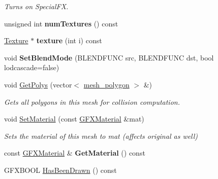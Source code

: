 \begin{DoxyCompactItemize}
\begin{DoxyCompactList}\small\item\em Turns on Special\+FX. \end{DoxyCompactList}\item 
unsigned int {\bfseries num\+Textures} () const \hypertarget{classMesh_a824d591c1cf5832f2dfadd765eb64cd2}{}\label{classMesh_a824d591c1cf5832f2dfadd765eb64cd2}

\item 
\hyperlink{classTexture}{Texture} $\ast$ {\bfseries texture} (int i) const \hypertarget{classMesh_ad19ac95e4498e54ecde68b92ed2b9863}{}\label{classMesh_ad19ac95e4498e54ecde68b92ed2b9863}

\item 
void {\bfseries Set\+Blend\+Mode} (B\+L\+E\+N\+D\+F\+U\+NC src, B\+L\+E\+N\+D\+F\+U\+NC dst, bool lodcascade=false)\hypertarget{classMesh_ad809849a87287d0b89f94a43120718ce}{}\label{classMesh_ad809849a87287d0b89f94a43120718ce}

\item 
void \hyperlink{classMesh_a84d2ab29e6396ba87c49813145ab2bc2}{Get\+Polys} (vector$<$ \hyperlink{structmesh__polygon}{mesh\+\_\+polygon} $>$ \&)\hypertarget{classMesh_a84d2ab29e6396ba87c49813145ab2bc2}{}\label{classMesh_a84d2ab29e6396ba87c49813145ab2bc2}

\begin{DoxyCompactList}\small\item\em Gets all polygons in this mesh for collision computation. \end{DoxyCompactList}\item 
void \hyperlink{classMesh_ad6f7f5a5972fbb324a304c4f6f8d7d56}{Set\+Material} (const \hyperlink{structGFXMaterial}{G\+F\+X\+Material} \&mat)\hypertarget{classMesh_ad6f7f5a5972fbb324a304c4f6f8d7d56}{}\label{classMesh_ad6f7f5a5972fbb324a304c4f6f8d7d56}

\begin{DoxyCompactList}\small\item\em Sets the material of this mesh to mat (affects original as well) \end{DoxyCompactList}\item 
const \hyperlink{structGFXMaterial}{G\+F\+X\+Material} \& {\bfseries Get\+Material} () const \hypertarget{classMesh_a683abc592f5e406a45d44704aadb9956}{}\label{classMesh_a683abc592f5e406a45d44704aadb9956}

\item 
G\+F\+X\+B\+O\+OL \hyperlink{classMesh_afe2ffaec2fe1b1ad52882fe98d836f57}{Has\+Been\+Drawn} () const \hypertarget{classMesh_afe2ffaec2fe1b1ad52882fe98d836f57}{}\label{classMesh_afe2ffaec2fe1b1ad52882fe98d836f57}


\end{DoxyCompactItemize}
